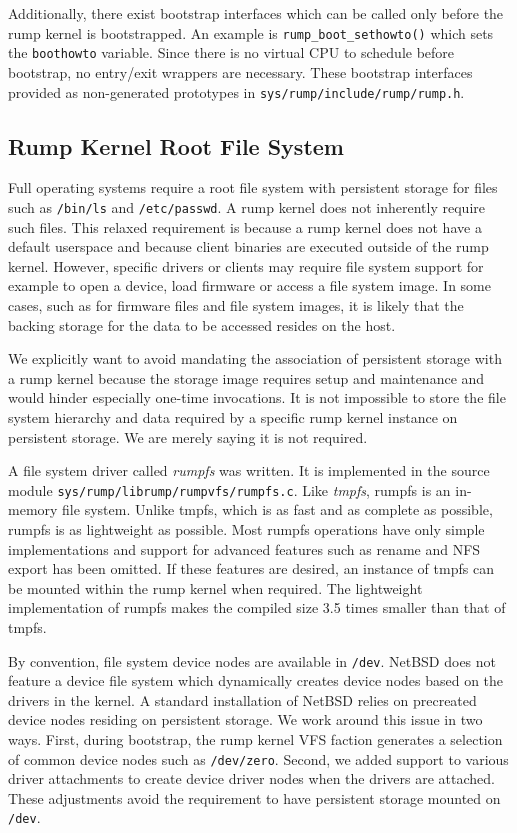 Additionally, there exist bootstrap interfaces
which can be called only before the rump kernel is bootstrapped.
An example is \verb+rump_boot_sethowto()+ which sets the
\texttt{boothowto} variable.  Since there is no virtual
CPU to schedule before bootstrap, no entry/exit wrappers are
necessary.  These bootstrap interfaces provided as non-generated prototypes
in \verb+sys/rump/include/rump/rump.h+.


\subsection{Rump Kernel Root File System}
\label{sect:rumpfs}

Full operating systems require a root file system with persistent
storage for files such as \texttt{/bin/ls} and \texttt{/etc/passwd}.
A rump kernel does not inherently require such files.  This relaxed
requirement is because a rump kernel does not have a default userspace
and because client binaries are executed outside of the rump kernel.
However, specific drivers or clients may require file system support for example
to open a device, load firmware or access a file system image.  In some
cases, such as for firmware files and file system images, it is likely
that the backing storage for the data to be accessed resides on the host.

We explicitly want to avoid mandating the association of persistent
storage with a rump kernel because the storage image requires setup
and maintenance and would hinder especially one-time invocations.
It is not impossible to store the file system
hierarchy and data required by a specific rump kernel instance on
persistent storage.  We are merely saying it is not required.

A file system driver called \textit{rumpfs}
was written.  It is implemented in the source module
\verb+sys/rump/librump/rumpvfs/rumpfs.c+.  Like \textit{tmpfs},
rumpfs is an in-memory file system.  Unlike tmpfs, which is as fast
and as complete as possible, rumpfs is as lightweight as possible.
Most rumpfs operations have only simple implementations and support
for advanced features such as rename and NFS export has been omitted.
If these features are desired, an instance of tmpfs can be mounted
within the rump kernel when required.  The lightweight implementation
of rumpfs makes the compiled size 3.5 times smaller than that of
tmpfs.

By convention, file system device nodes are available in \texttt{/dev}.
NetBSD does not feature a device file system which dynamically
creates device nodes based on the drivers in the kernel.
A standard installation of NetBSD relies on precreated
device nodes residing on persistent storage.  We work around this
issue in two ways.  First, during bootstrap, the rump kernel VFS
faction generates a selection of common device nodes such as
\texttt{/dev/zero}.  Second, we added support to various driver
attachments to create device driver nodes when the drivers are
attached.  These adjustments avoid the requirement to have persistent
storage mounted on \texttt{/dev}.

